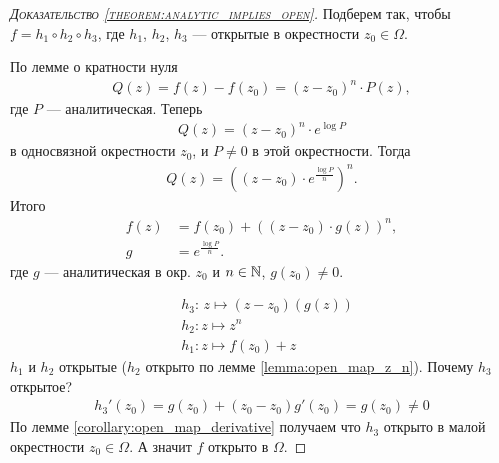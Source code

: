 \documentclass[../complex-analysis.tex]{subfiles}
\begin{document}
\begin{proof}[\normalfont\textsc{Доказательство \eqref{theorem:analytic_implies_open}}]
  Подберем так, чтобы $ f = h_1 \circ h_2 \circ h_3 $, где $ h_1 $, $ h_2 $, $ h_3 $ --- открытые в окрестности $ z_0 \in \Omega $.

 По лемме о кратности нуля
 \begin{align*}
  Q(z) = f(z) - f(z_0) = (z - z_0)^{n} \cdot P(z),
 \end{align*} где $ P $ --- аналитическая. Теперь
 \begin{align*}
  Q(z) = (z - z_0)^{n} \cdot e^{\log P}
 \end{align*} в односвязной окрестности $ z_0 $, и $ P \neq 0 $ в этой окрестности. Тогда
 \begin{align*}
  Q(z) = \left((z-z_0) \cdot e^{\frac{\log P}{n}}\right)^{n}.
 \end{align*} Итого
 \begin{align*}
  f(z) &= f(z_0) + \left((z - z_0) \cdot g(z) \right)^{n}, \\
  g &= e^{\frac{\log P}{n}}.
 \end{align*} где $ g $ --- аналитическая в окр. $ z_0 $ и $ n \in \mathbb{N} $, $ g(z_0) \neq 0 $.

 \begin{align*}
  &h_3 \colon\, z \mapsto (z-z_0)(g(z)) \\
  &h_2 \colon z \mapsto z^{n} \\
  &h_1 \colon z \mapsto f(z_0) + z
 \end{align*} $ h_1 $ и $ h_2 $ открытые ($h_2$ открыто по лемме \eqref{lemma:open_map_z_n}). Почему $ h_3 $ открытое?
 \begin{align*}
  h_3'(z_0) = g(z_0) + (z_0 - z_0) g'(z_0) = g(z_0) \neq 0
\end{align*} По лемме \eqref{corollary:open_map_derivative} получаем что $ h_3 $ открыто в малой окрестности $ z_0 \in \Omega $.
А значит $ f $ открыто в $ \Omega $.

\end{proof}
\end{document}
